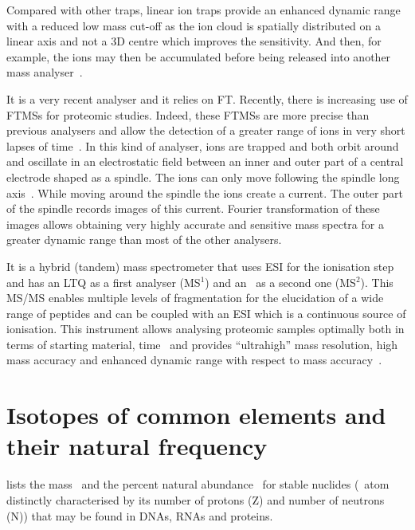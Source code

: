 Compared with other traps, linear ion traps provide an enhanced dynamic range
with a reduced low mass cut-off as the ion cloud is
spatially distributed on a linear axis and not a 3D centre which improves the
sensitivity. And then, for example, the ions may then be accumulated before
being released into another mass analyser~.

\minisec{\orbi}
It is a very recent analyser and it relies on \gls{FT}. Recently,
there is increasing use of \glspl{FTMS} for proteomic studies. Indeed, these
\glspl{FTMS} are more precise than previous analysers and allow the detection of
a greater range of ions in very short lapses of time~.
In this kind of analyser, ions are trapped and both orbit around and oscillate
in an electrostatic field between an inner and outer part of a central electrode
shaped as a spindle.
The ions can only move following the spindle long axis~.
While moving around the spindle the ions create a current.
The outer part of the spindle records images of this current.
Fourier transformation of these images allows obtaining very highly accurate
and sensitive mass spectra for a greater dynamic range than most of the
other analysers.~

It is a hybrid (tandem) mass spectrometer that uses \gls{ESI} for the ionisation
step and has an \gls{LTQ} as a first analyser (MS$^1$)
and an \orbi\ as a second one (MS$^2$).
This \gls{MS/MS} enables multiple levels of
fragmentation for the elucidation of a wide range of peptides and can be coupled
with an \gls{ESI} which is a continuous source of ionisation. This instrument
allows analysing proteomic samples optimally both in terms of starting material,
time~ and provides \enquote{ultrahigh} mass resolution,
high mass accuracy
and enhanced dynamic range with respect to mass accuracy~.

\section{Isotopes of common elements and their natural
frequency}\label{app:isotopes}
 lists the mass~
and the percent natural abundance~
for stable nuclides (\ie\ atom distinctly characterised by its number of protons (Z)
and number of neutrons (N)) that may be found in \glspl{DNA}, \glspl{RNA} and proteins.


